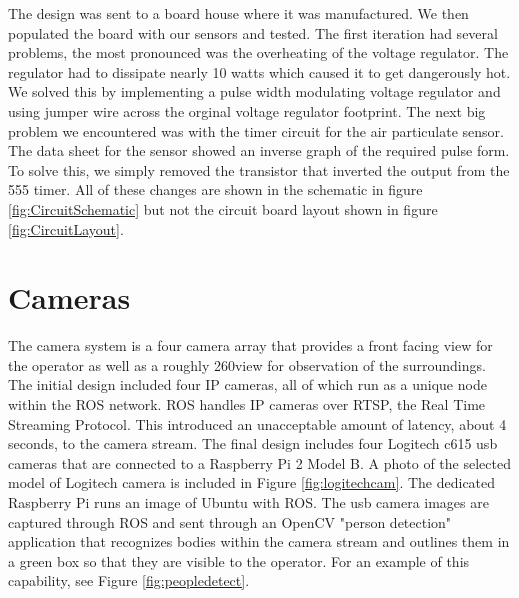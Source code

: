 The design was sent to a board house where it was manufactured. We then populated the board with our sensors and tested. The first iteration had several problems, the most pronounced was the overheating of the voltage regulator. The regulator had to dissipate nearly 10 watts which caused it to get dangerously hot. We solved this by implementing a pulse width modulating voltage regulator and using  jumper wire across the orginal voltage regulator footprint. The next big problem we encountered was with the timer circuit for the air particulate sensor. The data sheet for the sensor showed an inverse graph of the required pulse form. To solve this, we simply removed the transistor that inverted the output from the 555 timer. All of these changes are shown in the schematic in figure \ref{fig:CircuitSchematic} but not the circuit board layout shown in figure \ref{fig:CircuitLayout}.




\section{Cameras}

The camera system is a four camera array that provides a front facing view for the operator as well as a roughly 260\degree  view for observation of the surroundings. The initial design included four IP cameras, all of which run as a unique node within the ROS network. ROS handles IP cameras over RTSP, the Real Time Streaming Protocol. This introduced an unacceptable amount of latency, about 4 seconds, to the camera stream. The final design includes four Logitech c615 usb cameras that are connected to a Raspberry Pi 2 Model B. A photo of the selected model of Logitech camera is included in Figure \ref{fig:logitechcam}. The dedicated Raspberry Pi runs an image of Ubuntu with ROS. The usb camera images are captured through ROS and sent through an OpenCV "person detection" application that recognizes bodies within the camera stream and outlines them in a green box so that they are visible to the operator. For an example of this capability, see Figure \ref{fig:peopledetect}. 


